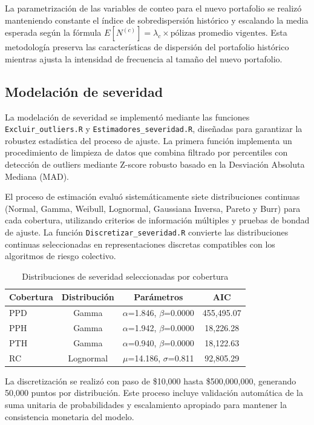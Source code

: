 La parametrización de las variables de conteo para el nuevo portafolio se realizó manteniendo constante el índice de sobredispersión histórico y escalando la media esperada según la fórmula $E[N^{(c)}] = \lambda_c \times \text{pólizas promedio vigentes}$. Esta metodología preserva las características de dispersión del portafolio histórico mientras ajusta la intensidad de frecuencia al tamaño del nuevo portafolio.


\subsection{Modelación de severidad}

La modelación de severidad se implementó mediante las funciones \texttt{Excluir\_outliers.R} y \texttt{Estimadores\_severidad.R}, diseñadas para garantizar la robustez estadística del proceso de ajuste. La primera función implementa un procedimiento de limpieza de datos que combina filtrado por percentiles con detección de outliers mediante Z-score robusto basado en la Desviación Absoluta Mediana (MAD).

El proceso de estimación evaluó sistemáticamente siete distribuciones continuas (Normal, Gamma, Weibull, Lognormal, Gaussiana Inversa, Pareto y Burr) para cada cobertura, utilizando criterios de información múltiples y pruebas de bondad de ajuste. La función \texttt{Discretizar\_severidad.R} convierte las distribuciones continuas seleccionadas en representaciones discretas compatibles con los algoritmos de riesgo colectivo.

\begin{table}[H]
\centering
\caption{Distribuciones de severidad seleccionadas por cobertura}
\begin{tabular}{lccc}
\hline
\textbf{Cobertura} & \textbf{Distribución} & \textbf{Parámetros} & \textbf{AIC} \\
\hline
PPD & Gamma & $\alpha$=1.846, $\beta$=0.0000 & 455,495.07 \\
PPH & Gamma & $\alpha$=1.942, $\beta$=0.0000 & 18,226.28 \\
PTH & Gamma & $\alpha$=0.940, $\beta$=0.0000 & 18,122.63 \\
RC & Lognormal & $\mu$=14.186, $\sigma$=0.811 & 92,805.29 \\
\hline
\end{tabular}
\end{table}

La discretización se realizó con paso de \$10,000 hasta \$500,000,000, generando 50,000 puntos por distribución. Este proceso incluye validación automática de la suma unitaria de probabilidades y escalamiento apropiado para mantener la consistencia monetaria del modelo.


